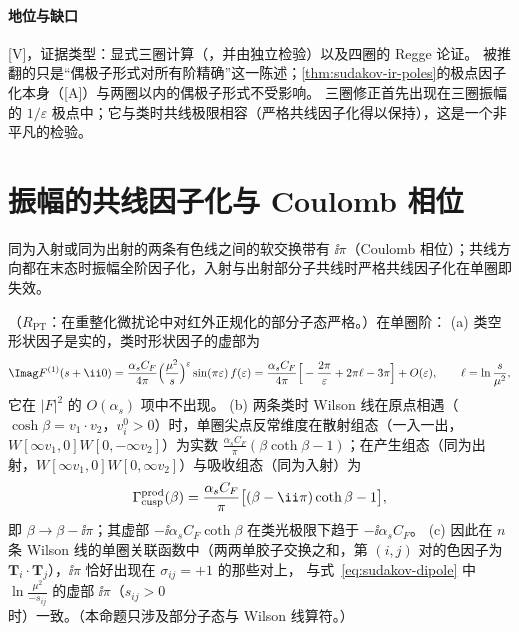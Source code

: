 \paragraph{地位与缺口}[V]，证据类型：显式三圈计算（\cite{Almelid:2015jia}，并由\cite{Henn:2016jdu}独立检验）以及四圈的 Regge 论证\cite{Caron-Huot:2013fea}。
被推翻的只是“偶极子形式对所有阶精确”这一陈述；\cref{thm:sudakov-ir-poles}的极点因子化本身（[A]）与两圈以内的偶极子形式不受影响。
三圈修正首先出现在三圈振幅的 $1/\varepsilon$ 极点中；它与类时共线极限相容（严格共线因子化得以保持），这是一个非平凡的检验。
\section{振幅的共线因子化与 Coulomb 相位}\label{sec:sudakov-collinear}

同为入射或同为出射的两条有色线之间的软交换带有 $\ii\pi$（Coulomb 相位）；共线方向都在末态时振幅全阶因子化，入射与出射部分子共线时严格共线因子化在单圈即失效。

\begin{proposition}\label{prop:sudakov-coulomb}
（$R_{\mathrm{PT}}$：在重整化微扰论中对红外正规化的部分子态严格。）在单圈阶：
(a) 类空形状因子是实的，类时形状因子的虚部为
\begin{equation}\label{eq:sudakov-coulomb-ff}
\Imag F^{(1)}(s+\ii0)=\frac{\alpha_sC_F}{4\pi}\Big(\frac{\mu^2}{s}\Big)^{\varepsilon}\sin(\pi\varepsilon)\,f(\varepsilon)
=\frac{\alpha_sC_F}{4\pi}\Big[-\frac{2\pi}{\varepsilon}+2\pi\ell-3\pi\Big]+O(\varepsilon),\qquad \ell=\ln\frac{s}{\mu^2},
\end{equation}
它在 $|F|^2$ 的 $O(\alpha_s)$ 项中不出现。
(b) 两条类时 Wilson 线在原点相遇（$\cosh\beta=v_1\cdot v_2$，$v_i^0>0$）时，单圈尖点反常维度在散射组态（一入一出，$W[\infty v_1,0]W[0,-\infty v_2]$）为实数
$\frac{\alpha_sC_F}\pi(\beta\coth\beta-1)$；在产生组态（同为出射，$W[\infty v_1,0]W[0,\infty v_2]$）与吸收组态（同为入射）为
\begin{equation}\label{eq:sudakov-coulomb-cusp}
\Gamma_{\rm cusp}^{\rm prod}(\beta)=\frac{\alpha_sC_F}{\pi}\big[(\beta-\ii\pi)\coth\beta-1\big],
\end{equation}
即 $\beta\to\beta-\ii\pi$；其虚部 $-\ii\alpha_sC_F\coth\beta$ 在类光极限下趋于 $-\ii\alpha_sC_F$。
(c) 因此在 $n$ 条 Wilson 线的单圈关联函数中（两两单胶子交换之和，第 $(i,j)$ 对的色因子为 $\mathbf T_i\cdot\mathbf T_j$），$\ii\pi$ 恰好出现在 $\sigma_{ij}=+1$ 的那些对上，
与式~\eqref{eq:sudakov-dipole} 中 $\ln\frac{\mu^2}{-s_{ij}}$ 的虚部 $\ii\pi$（$s_{ij}>0$ 时）一致。（本命题只涉及部分子态与 Wilson 线算符。）
\end{proposition}

